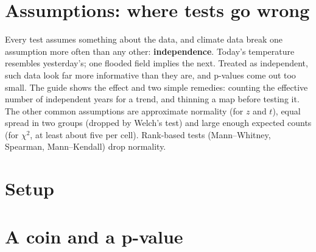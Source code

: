 \section{Assumptions: where tests go wrong}
Every test assumes something about the data, and climate data break one assumption more often than any other: \textbf{independence}. Today's temperature resembles yesterday's; one flooded field implies the next. Treated as independent, such data look far more informative than they are, and p-values come out too small. The guide shows the effect and two simple remedies: counting the effective number of independent years for a trend, and thinning a map before testing it. The other common assumptions are approximate normality (for $z$ and $t$), equal spread in two groups (dropped by Welch's test) and large enough expected counts (for $\chi^2$, at least about five per cell). Rank-based tests (Mann--Whitney, Spearman, Mann--Kendall) drop normality.

\section{Setup}

\section{A coin and a p-value}

